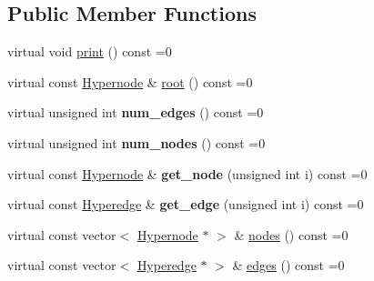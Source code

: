 \subsection*{Public Member Functions}
\begin{DoxyCompactItemize}
\item 
virtual void \hyperlink{classScarab_1_1HG_1_1HGraph_ab5aa11c932b28864b56f28e0babbc1c1}{print} () const =0
\item 
virtual const \hyperlink{classScarab_1_1HG_1_1Hypernode}{Hypernode} \& \hyperlink{classScarab_1_1HG_1_1HGraph_a5ede392b158e41dd7e95ded1c4b0b5d6}{root} () const =0
\item 
\hypertarget{classScarab_1_1HG_1_1HGraph_a8309003db80be5bdbe4bb64f98a78ea8}{
virtual unsigned int {\bfseries num\_\-edges} () const =0}
\label{classScarab_1_1HG_1_1HGraph_a8309003db80be5bdbe4bb64f98a78ea8}

\item 
\hypertarget{classScarab_1_1HG_1_1HGraph_a6f4d37ef034cb38aa09c702b80a6e4f7}{
virtual unsigned int {\bfseries num\_\-nodes} () const =0}
\label{classScarab_1_1HG_1_1HGraph_a6f4d37ef034cb38aa09c702b80a6e4f7}

\item 
\hypertarget{classScarab_1_1HG_1_1HGraph_acad57dd952956b1a1a4367bba0e9383b}{
virtual const \hyperlink{classScarab_1_1HG_1_1Hypernode}{Hypernode} \& {\bfseries get\_\-node} (unsigned int i) const =0}
\label{classScarab_1_1HG_1_1HGraph_acad57dd952956b1a1a4367bba0e9383b}

\item 
\hypertarget{classScarab_1_1HG_1_1HGraph_aa599b296ae01affc9606f519e4e44e9e}{
virtual const \hyperlink{classScarab_1_1HG_1_1Hyperedge}{Hyperedge} \& {\bfseries get\_\-edge} (unsigned int i) const =0}
\label{classScarab_1_1HG_1_1HGraph_aa599b296ae01affc9606f519e4e44e9e}

\item 
virtual const vector$<$ \hyperlink{classScarab_1_1HG_1_1Hypernode}{Hypernode} $\ast$ $>$ \& \hyperlink{classScarab_1_1HG_1_1HGraph_a74d893fba015520774f71f02a46bb6ca}{nodes} () const =0
\item 
virtual const vector$<$ \hyperlink{classScarab_1_1HG_1_1Hyperedge}{Hyperedge} $\ast$ $>$ \& \hyperlink{classScarab_1_1HG_1_1HGraph_a57328729f90cc4152ca79ff15ecdd4bb}{edges} () const =0
\end{DoxyCompactItemize}


